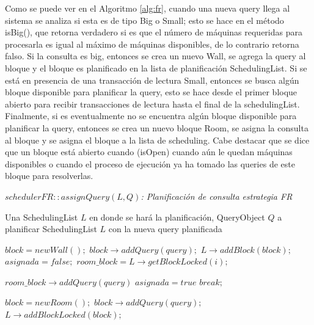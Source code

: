 Como se puede ver en el Algoritmo \ref{alg:fr}, cuando una nueva query llega al sistema se analiza si esta es de tipo Big o Small; esto se hace en el método isBig(), que retorna verdadero si es que el número de máquinas requeridas para procesarla es igual al máximo de máquinas disponibles, de lo contrario retorna falso. Si la consulta es big, entonces se crea un nuevo Wall, se agrega la query al bloque y el bloque es planificado en la lista de planificación SchedulingList. Si se está en presencia de una transacción de lectura Small, entonces se busca algún bloque disponible para planificar la query, esto se hace desde el primer bloque abierto para recibir transacciones de lectura hasta el final de la schedulingList. Finalmente, si es eventualmente no se encuentra algún bloque disponible para planificar la query, entonces se crea un nuevo bloque Room, se asigna la consulta al bloque y se asigna el bloque a la lista de scheduling. Cabe destacar que se dice que un bloque está abierto cuando (isOpen) cuando aún le quedan máquinas disponibles o cuando el proceso de ejecución ya ha tomado las queries de este bloque para resolverlas.

\begin{algorithm}[!th]
\caption{\em $schedulerFR::assignQuery(L, Q)$: Planificación de consulta estrategia FR}
\label{alg:fr}
\begin{algorithmic}[1]
\REQUIRE Una SchedulingList $L$ en donde se hará la planificación, QueryObject $Q$ a planificar
\ENSURE SchedulingList $L$ con la nueva query planificada

	\STATE $block = new Wall();$
	\STATE $block \rightarrow addQuery(query);$
	\STATE $L \rightarrow addBlock(block);$
\ELSE
	\STATE $asignada = false;$
		\STATE $room\_block = L \rightarrow getBlockLocked(i);$
		
			\STATE $room\_block \rightarrow addQuery(query)$
			\STATE $asignada = true$
			\STATE $break;$
		\ENDIF
	\ENDFOR
	
		\STATE $block = new Room();$
		\STATE $block \rightarrow addQuery(query);$
		\STATE $L \rightarrow addBlockLocked(block);$		
	\ENDIF
\ENDIF

\end{algorithmic}
\end{algorithm}



